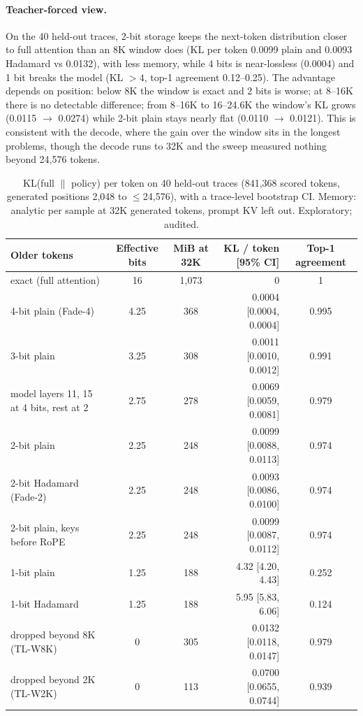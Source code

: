 \documentclass{article}
\begin{document}
\paragraph{Teacher-forced view.} On the 40 held-out traces, 2-bit storage keeps the next-token distribution closer to full attention than an 8K window does (KL per token 0.0099 plain and 0.0093 Hadamard vs 0.0132), with less memory, while 4 bits is near-lossless (0.0004) and 1 bit breaks the model (KL $>4$, top-1 agreement 0.12--0.25). The advantage depends on position: below 8K the window is exact and 2 bits is worse; at 8--16K there is no detectable difference; from 8--16K to 16--24.6K the window's KL grows (0.0115 $\to$ 0.0274) while 2-bit plain stays nearly flat (0.0110 $\to$ 0.0121). This is consistent with the decode, where the gain over the window sits in the longest problems, though the decode runs to 32K and the sweep measured nothing beyond 24,576 tokens.
\begin{table}[H]
\caption{KL(full $\|$ policy) per token on 40 held-out traces (841,368 scored tokens, generated positions 2,048 to $\le$24,576), with a trace-level bootstrap CI. Memory: analytic per sample at 32K generated tokens, prompt KV left out. Exploratory; audited.}
\centering
\small
\setlength{\tabcolsep}{3pt}
\begin{tabular}{@{}lccrc@{}}
\toprule
Older tokens & Effective bits & MiB at 32K & KL / token [95\% CI] & Top-1 agreement \\
\midrule
exact (full attention) & 16 & 1,073 & 0 & 1 \\
4-bit plain (Fade-4) & 4.25 & 368 & 0.0004 [0.0004, 0.0004] & 0.995 \\
3-bit plain & 3.25 & 308 & 0.0011 [0.0010, 0.0012] & 0.991 \\
model layers 11, 15 at 4 bits, rest at 2 & 2.75 & 278 & 0.0069 [0.0059, 0.0081] & 0.979 \\
2-bit plain & 2.25 & 248 & 0.0099 [0.0088, 0.0113] & 0.974 \\
2-bit Hadamard (Fade-2) & 2.25 & 248 & 0.0093 [0.0086, 0.0100] & 0.974 \\
2-bit plain, keys before RoPE & 2.25 & 248 & 0.0099 [0.0087, 0.0112] & 0.974 \\
1-bit plain & 1.25 & 188 & 4.32 [4.20, 4.43] & 0.252 \\
1-bit Hadamard & 1.25 & 188 & 5.95 [5.83, 6.06] & 0.124 \\
dropped beyond 8K (TL-W8K) & 0 & 305 & 0.0132 [0.0118, 0.0147] & 0.979 \\
dropped beyond 2K (TL-W2K) & 0 & 113 & 0.0700 [0.0655, 0.0744] & 0.939 \\
\bottomrule
\end{tabular}
\end{table}
\end{document}
